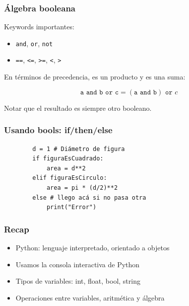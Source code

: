 \documentclass[14pt,aspectratio=169,xcolor=dvipsnames]{beamer}
\begin{document}
\begin{frame}\frametitle{Álgebra booleana}
    Keywords importantes: 
    \begin{itemize}
        \item \texttt{and}, \texttt{or}, \texttt{not}
        \item \texttt{==}, \texttt{<=}, \texttt{>=}, \texttt{<}, \texttt{>}
    \end{itemize}

En términos de precedencia,  es un producto y  es una suma: 

$$ \texttt{a and b or c} = (\texttt{a and b}) \texttt{ or } c $$

Notar que el resultado es siempre otro booleano.
\end{frame}
\begin{frame}[fragile]\frametitle{Usando bools: if/then/else}

    \begin{verbatim}
        d = 1 # Diámetro de figura
        if figuraEsCuadrado:
            area = d**2
        elif figuraEsCirculo:
            area = pi * (d/2)**2
        else # llego acá si no pasa otra
            print("Error")
    \end{verbatim}    
\end{frame}
\begin{frame}\frametitle{Recap}
    \begin{itemize}
        \item Python: lenguaje interpretado, orientado a objetos
        \item Usamos la consola interactiva de Python
        \item Tipos de variables: int, float, bool, string
        \item Operaciones entre variables, aritmética y álgebra
    \end{itemize}
\end{frame}
\begin{frame}
    \maketitle
\end{frame}
\end{document}

